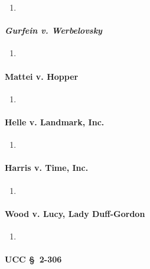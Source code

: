 \begin{enumerate}
    \item %
\end{enumerate}

\paragraph{\emph{Gurfein v. Werbelovsky}}

\begin{enumerate}
    \item %
\end{enumerate}

\paragraph{Mattei v. Hopper}

\begin{enumerate}
    \item %
\end{enumerate}

\paragraph{Helle v. Landmark, Inc.}

\begin{enumerate}
    \item %
\end{enumerate}

\paragraph{Harris v. Time, Inc.}

\begin{enumerate}
    \item %
\end{enumerate}

\paragraph{Wood v. Lucy, Lady Duff-Gordon}

\begin{enumerate}
    \item %
\end{enumerate}

\paragraph{UCC \S\ 2-306}

